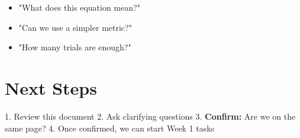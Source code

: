 \documentclass[11pt]{article}
\begin{document}
\begin{itemize}
    \item "What does this equation mean?"
    \item "Can we use a simpler metric?"
    \item "How many trials are enough?"
\end{itemize}

\section{Next Steps}
1. Review this document
2. Ask clarifying questions
3. \textbf{Confirm:} Are we on the same page?
4. Once confirmed, we can start Week 1 tasks
\end{document}
